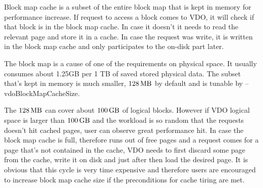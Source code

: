 \documentclass[
  color, %
  table, %
  lof,   %
  lot,   %
]{fithesis3}
\begin{document}
Block map cache is a subset of the entire block map that is kept in memory for performance increase. If request to access a block comes to VDO, it will check if that block is in the block map cache. In case it doesn't it needs to read the relevant page and store it in a cache. In case the request was write, it is written in the block map cache and only participates to the on-disk part later.

The block map is a cause of one of the requirements on physical space. It usually consumes about 1.25GB per 1 TB of saved stored physical data. The subset that's kept in memory is much smaller, $\SI{128}{\mega\byte}$ by default and is tunable by --vdoBlockMapCacheSize.

The $\SI{128}{\mega\byte}$ can cover about $\SI{100}{\giga\byte}$ of logical blocks. However if VDO logical space is larger than $\SI{100}{\giga\byte}$ and the workload is so random that the requests doesn't hit cached pages, user can observe great performance hit. In case the block map cache is full, therefore runs out of free pages and a request comes for a page that's not contained in the cache, VDO needs to first discard some page from the cache, write it on disk and just after then load the desired page. It is obvious that this cycle is very time expensive and therefore users are encouraged to increase block map cache size if the preconditions for cache tiring are met.








\end{document}
